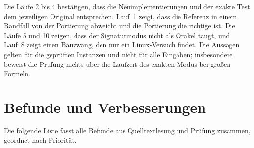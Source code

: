 Die Läufe 2 bis 4 bestätigen, dass die Neuimplementierungen und der exakte Test dem jeweiligen Original entsprechen. Lauf~1 zeigt, dass die Referenz in einem Randfall von der Portierung abweicht und die Portierung die richtige ist. Die Läufe 5 und 10 zeigen, dass der Signaturmodus nicht als Orakel taugt, und Lauf~8 zeigt einen Bauzwang, den nur ein Linux-Versuch findet. Die Aussagen gelten für die geprüften Instanzen und nicht für alle Eingaben; insbesondere beweist die Prüfung nichts über die Laufzeit des exakten Modus bei großen Formeln.

\chapter{Befunde und Verbesserungen}
\label{chap:befunde}

Die folgende Liste fasst alle Befunde aus Quelltextlesung und Prüfung zusammen, geordnet nach Priorität.

